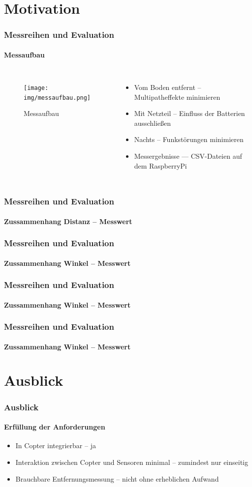 \documentclass{beamer}
\begin{document}
\section{Motivation}

\begin{frame}
	\frametitle{Messreihen und Evaluation}
	\framesubtitle{Messaufbau}
	\begin{columns}
		\begin{figure}
			\centering
			\texttt{[image: img/messaufbau.png]}
			\caption{Messaufbau}
		\end{figure}
		\begin{itemize}
			\item Vom Boden entfernt – Multipatheffekte minimieren
			\item Mit Netzteil – Einfluss der Batterien ausschließen
			\item Nachts – Funkstörungen minimieren
			\item Messergebnisse — CSV-Dateien auf dem RaspberryPi
		\end{itemize}
	\end{columns}
\end{frame}

\begin{frame}
	\frametitle{Messreihen und Evaluation}
	\framesubtitle{Zussammenhang Distanz – Messwert}
	


\end{frame}

\begin{frame}
	\frametitle{Messreihen und Evaluation}
	\framesubtitle{Zussammenhang Winkel – Messwert}
	
\end{frame}

\begin{frame}
	\frametitle{Messreihen und Evaluation}
	\framesubtitle{Zussammenhang Winkel – Messwert}
	
\end{frame}


\begin{frame}
	\frametitle{Messreihen und Evaluation}
	\framesubtitle{Zussammenhang Winkel – Messwert}
	
\end{frame}

\section{Ausblick}
\begin{frame}
	\frametitle{Ausblick}
	\framesubtitle{Erfüllung der Anforderungen}
	\begin{itemize}
		\item In Copter integrierbar – ja
		\item Interaktion zwischen Copter und Sensoren minimal – zumindest nur einseitig
		\item Brauchbare Entfernungsmessung – nicht ohne erheblichen Aufwand
	\end{itemize}
\end{frame}
\end{document}
